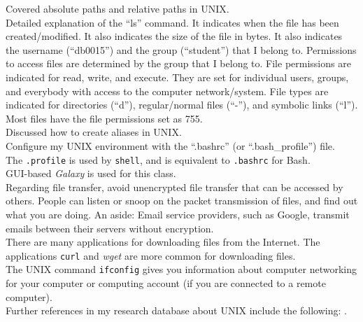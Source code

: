 Covered absolute paths and relative paths in UNIX. \\

Detailed explanation of the ``ls'' command. It indicates when the file has been created/modified. It also indicates the size of the file in bytes. It also indicates the username (``db0015'') and the group (``student'') that I belong to. Permissions to access files are determined by the group that I belong to. File permissions are indicated for read, write, and execute. They are set for individual users, groups, and everybody with access to the computer network/system. File types are indicated for directories (``d''), regular/normal files (``-''), and symbolic links (``l''). \\

Most files have the file permissions set as 755. \\

Discussed how to create aliases in UNIX. \\

Configure my UNIX environment with the ``.bashrc'' (or ``.bash\_profile'') file.  \\

The {\tt .profile} is used by {\tt shell}, and is equivalent to {\tt .bashrc} for Bash. \\

GUI-based {\it Galaxy} is used for this class. \\


Regarding file transfer, avoid unencrypted file transfer that can be accessed by others. People can listen or snoop on the packet transmission of files, and find out what you are doing. An aside: Email service providers, such as Google, transmit emails between their servers without encryption. \\

There are many applications for downloading files from the Internet. The applications {\tt curl} and {\it wget} are more common for downloading files. \\

The UNIX command {\tt ifconfig} gives you information about computer networking for your computer or computing account (if you are connected to a remote computer). \\





Further references in my research database about UNIX include the following: \cite{Apple2011,Kernighan1984,Kerrisk2010,Mitchell2001,Petersen2008,Raymond2004,Raymond2004a,Rochkind2004,Rosen2007a,Stallings2005,Stevens2013,Storimer2012,VibrantPublishers2010a,VibrantPublishers2011b,VibrantPublishers2011c,VibrantPublishers2011h}.

